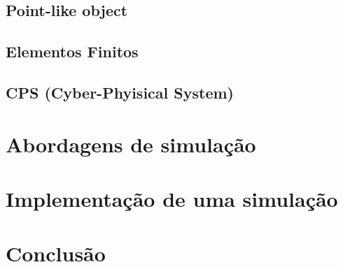 \documentclass{beamer}
\begin{document}
		\subsection{Point-like object}
		\subsection{Elementos Finitos}
		\subsection{CPS (Cyber-Phyisical System)}		
	\section{Abordagens de simulação}
	\section{Implementação de uma simulação}
	\section{Conclusão}
\end{document}
